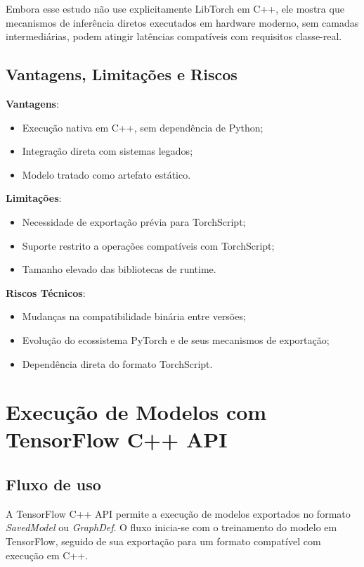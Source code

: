 Embora esse estudo não use explicitamente LibTorch em C++, ele mostra que mecanismos de inferência diretos executados em hardware moderno, sem camadas intermediárias, podem atingir latências compatíveis com requisitos classe-real.

\subsection{Vantagens, Limitações e Riscos}

\textbf{Vantagens}:
\begin{itemize}
    \item Execução nativa em C++, sem dependência de Python;
    \item Integração direta com sistemas legados;
    \item Modelo tratado como artefato estático.
\end{itemize}

\textbf{Limitações}:
\begin{itemize}
    \item Necessidade de exportação prévia para TorchScript;
    \item Suporte restrito a operações compatíveis com TorchScript;
    \item Tamanho elevado das bibliotecas de runtime.
\end{itemize}

\textbf{Riscos Técnicos}:
\begin{itemize}
    \item Mudanças na compatibilidade binária entre versões;
    \item Evolução do ecossistema PyTorch e de seus mecanismos de exportação;
    \item Dependência direta do formato TorchScript.
\end{itemize}

\section{Execução de Modelos com TensorFlow C++ API}

\subsection{Fluxo de uso}

A TensorFlow C++ API permite a execução de modelos exportados no formato
\textit{SavedModel} ou \textit{GraphDef}. O fluxo inicia-se com o treinamento do
modelo em TensorFlow, seguido de sua exportação para um formato compatível com
execução em C++.

